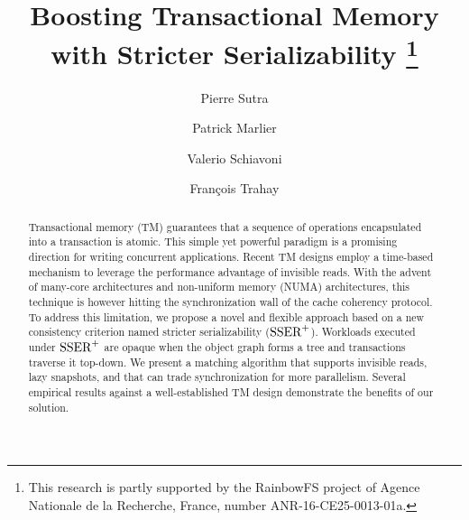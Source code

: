 \documentclass[]{llncs}
\begin{document}
{ \newcommand{\mynote}[3]{
   \fbox{\bfseries\sffamily\scriptsize#1}
   {\small$\blacktriangleright$\textsf{\emph{\color{#3}{#2}}}$\blacktriangleleft$}}}
{ \newcommand{\mynote}[3]{}}
\newcommand{\pf}[1]{\mynote{Pierre}{#1}{red}}
\newcommand{\hm}[1]{\mynote{Patrick}{#1}{pink}}
\newcommand{\vs}[1]{\mynote{Valerio}{#1}{blue}}
\newcommand{\ft}[1]{\mynote{Francois}{#1}{green}}


\title{Boosting Transactional Memory\\with Stricter Serializability%
  \thanks{
    This research is partly supported by the RainbowFS project of Agence Nationale de la Recherche, France, number ANR-16-CE25-0013-01a.
  }
}

\author{
  Pierre Sutra
  \and Patrick Marlier
  \and Valerio Schiavoni %
  \and Fran\c{c}ois Trahay %
}



\maketitle

\noindent
{}

\begin{abstract}
  Transactional memory (TM) guarantees that a sequence of operations encapsulated into a transaction is atomic.
  This simple yet powerful paradigm is a promising direction for writing concurrent applications.
  Recent TM designs employ a time-based mechanism to leverage the performance advantage of invisible reads.
  With the advent of many-core architectures and non-uniform memory (NUMA) architectures, this technique is however hitting the synchronization wall of the cache coherency protocol.
  To address this limitation, we propose a novel and flexible approach based on a new consistency criterion named stricter serializability ($\SPSER$).
  Workloads executed under $\SPSER$ are opaque when the object graph forms a tree and transactions traverse it top-down.  
  We present a matching algorithm that supports invisible reads, lazy snapshots, and that can trade synchronization for more parallelism.
  Several empirical results against a well-established TM design demonstrate the benefits of our solution.
\end{abstract}




%




{
  
  
}

\clearpage
\appendix

\end{document}
